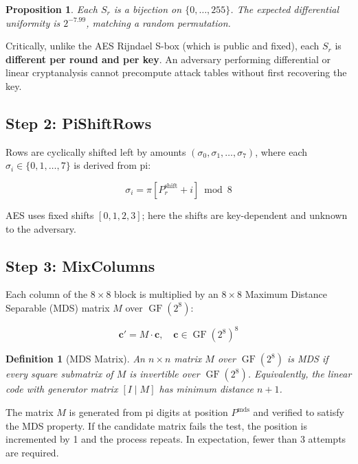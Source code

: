 \documentclass[12pt, a4paper]{article}
\newtheorem{definition}{Definition}[section]
\newtheorem{proposition}{Proposition}[section]
\DeclareMathOperator{\GF}{GF}
\begin{document}
\begin{proposition}
Each $S_r$ is a bijection on $\{0,\ldots,255\}$. The expected differential uniformity is $2^{-7.99}$, matching a random permutation.
\end{proposition}

Critically, unlike the AES Rijndael S-box (which is public and fixed), each $S_r$ is \textbf{different per round and per key}. An adversary performing differential or linear cryptanalysis cannot precompute attack tables without first recovering the key.

\subsection{Step 2: PiShiftRows}

Rows are cyclically shifted left by amounts $(\sigma_0, \sigma_1, \ldots, \sigma_7)$, where each $\sigma_i \in \{0, 1, \ldots, 7\}$ is derived from pi:

\begin{equation}
  \sigma_i = \pi[P^{\text{shift}}_r + i] \bmod 8
\end{equation}

AES uses fixed shifts $[0, 1, 2, 3]$; here the shifts are key-dependent and unknown to the adversary.

\subsection{Step 3: MixColumns}

Each column of the $8\times 8$ block is multiplied by an $8 \times 8$ Maximum Distance Separable (MDS) matrix $M$ over $\GF(2^8)$:

\begin{equation}
  \mathbf{c}' = M \cdot \mathbf{c}, \quad \mathbf{c} \in \GF(2^8)^8
\end{equation}

\begin{definition}[MDS Matrix]
An $n \times n$ matrix $M$ over $\GF(2^8)$ is MDS if every square submatrix of $M$ is invertible over $\GF(2^8)$. Equivalently, the linear code with generator matrix $[I \mid M]$ has minimum distance $n+1$.
\end{definition}

The matrix $M$ is generated from pi digits at position $P^{\text{mds}}$ and verified to satisfy the MDS property. If the candidate matrix fails the test, the position is incremented by 1 and the process repeats. In expectation, fewer than 3 attempts are required.
\end{document}
